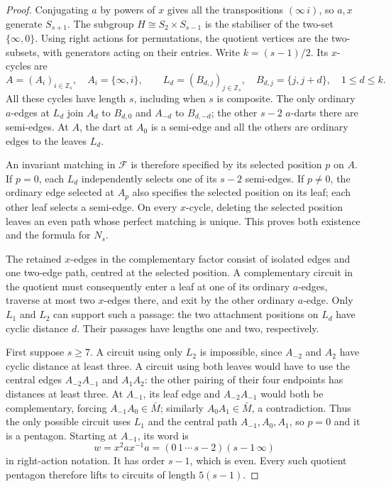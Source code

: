\documentclass[11pt,a4paper]{article}
\theoremstyle{definition}
\theoremstyle{remark}
\newcommand{\ZZ}{\mathbb{Z}}
\begin{document}
\begin{proof}
Conjugating $a$ by powers of $x$ gives all the transpositions $(\infty\,i)$, so $a,x$ generate $S_{s+1}$.  The subgroup $H\cong S_2\times S_{s-1}$ is the stabiliser of the two-set $\{\infty,0\}$.  Using right actions for permutations, the quotient vertices are the two-subsets, with generators acting on their entries.  Write $k=(s-1)/2$.  Its $x$-cycles are
\[
 A=(A_i)_{i\in\ZZ_s},\quad A_i=\{\infty,i\},\qquad
 L_d=(B_{d,j})_{j\in\ZZ_s},\quad B_{d,j}=\{j,j+d\},\quad 1\le d\le k.
\]
All these cycles have length $s$, including when $s$ is composite.  The only ordinary $a$-edges at $L_d$ join $A_d$ to $B_{d,0}$ and $A_{-d}$ to $B_{d,-d}$; the other $s-2$ $a$-darts there are semi-edges.  At $A$, the dart at $A_0$ is a semi-edge and all the others are ordinary edges to the leaves $L_d$.

An invariant matching in $\mathcal F$ is therefore specified by its selected position $p$ on $A$.  If $p=0$, each $L_d$ independently selects one of its $s-2$ semi-edges.  If $p\ne0$, the ordinary edge selected at $A_p$ also specifies the selected position on its leaf; each other leaf selects a semi-edge.  On every $x$-cycle, deleting the selected position leaves an even path whose perfect matching is unique.  This proves both existence and the formula for $N_s$.

The retained $x$-edges in the complementary factor consist of isolated edges and one two-edge path, centred at the selected position.  A complementary circuit in the quotient must consequently enter a leaf at one of its ordinary $a$-edges, traverse at most two $x$-edges there, and exit by the other ordinary $a$-edge.  Only $L_1$ and $L_2$ can support such a passage: the two attachment positions on $L_d$ have cyclic distance $d$.  Their passages have lengths one and two, respectively.

First suppose $s\ge7$.  A circuit using only $L_2$ is impossible, since $A_{-2}$ and $A_2$ have cyclic distance at least three.  A circuit using both leaves would have to use the central edges $A_{-2}A_{-1}$ and $A_1A_2$: the other pairing of their four endpoints has distances at least three.  At $A_{-1}$, its leaf edge and $A_{-2}A_{-1}$ would both be complementary, forcing $A_{-1}A_0\in\bar M$; similarly $A_0A_1\in\bar M$, a contradiction.  Thus the only possible circuit uses $L_1$ and the central path $A_{-1},A_0,A_1$, so $p=0$ and it is a pentagon.  Starting at $A_{-1}$, its word is
\[
 w=x^2ax^{-1}a=(0\,1\,\cdots\,s-2)(s-1\,\infty)
\]
in right-action notation.  It has order $s-1$, which is even.  Every such quotient pentagon therefore lifts to circuits of length $5(s-1)$.


\end{proof}
\end{document}
